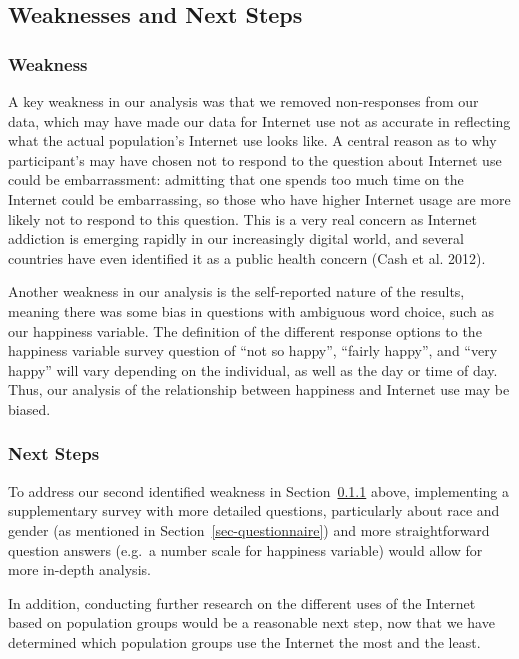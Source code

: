 \documentclass[
]{article}
\begin{document}
\hypertarget{sec-weaknessesandnextsteps}{%
\subsection{Weaknesses and Next
Steps}\label{sec-weaknessesandnextsteps}}

\hypertarget{sec-weaknesses}{%
\subsubsection{Weakness}\label{sec-weaknesses}}

A key weakness in our analysis was that we removed non-responses from
our data, which may have made our data for Internet use not as accurate
in reflecting what the actual population's Internet use looks like. A
central reason as to why participant's may have chosen not to respond to
the question about Internet use could be embarrassment: admitting that
one spends too much time on the Internet could be embarrassing, so those
who have higher Internet usage are more likely not to respond to this
question. This is a very real concern as Internet addiction is emerging
rapidly in our increasingly digital world, and several countries have
even identified it as a public health concern (Cash et al. 2012).

Another weakness in our analysis is the self-reported nature of the
results, meaning there was some bias in questions with ambiguous word
choice, such as our happiness variable. The definition of the different
response options to the happiness variable survey question of ``not so
happy'', ``fairly happy'', and ``very happy'' will vary depending on the
individual, as well as the day or time of day. Thus, our analysis of the
relationship between happiness and Internet use may be biased.

\hypertarget{next-steps}{%
\subsubsection{Next Steps}\label{next-steps}}

To address our second identified weakness in
Section~\ref{sec-weaknesses} above, implementing a supplementary survey
with more detailed questions, particularly about race and gender (as
mentioned in Section~\ref{sec-questionnaire}) and more straightforward
question answers (e.g.~a number scale for happiness variable) would
allow for more in-depth analysis.

In addition, conducting further research on the different uses of the
Internet based on population groups would be a reasonable next step, now
that we have determined which population groups use the Internet the
most and the least.
\end{document}
